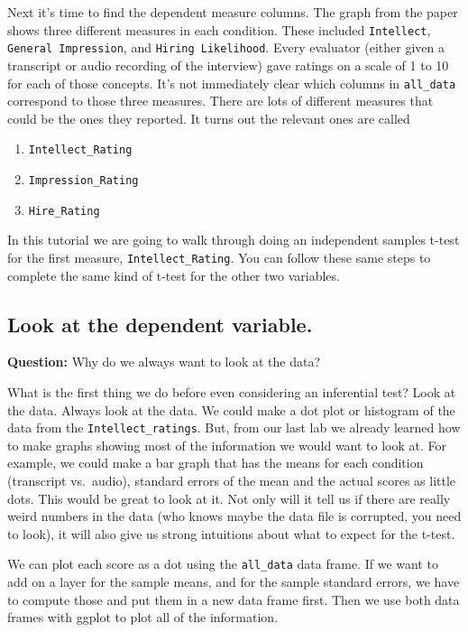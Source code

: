 \documentclass[]{book}
\providecommand{\tightlist}{%
  \setlength{\itemsep}{0pt}\setlength{\parskip}{0pt}}
\begin{document}
Next it's time to find the dependent measure columns. The graph from the
paper shows three different measures in each condition. These included
\texttt{Intellect}, \texttt{General\ Impression}, and
\texttt{Hiring\ Likelihood}. Every evaluator (either given a transcript
or audio recording of the interview) gave ratings on a scale of 1 to 10
for each of those concepts. It's not immediately clear which columns in
\texttt{all\_data} correspond to those three measures. There are lots of
different measures that could be the ones they reported. It turns out
the relevant ones are called

\begin{enumerate}
\def\labelenumi{\arabic{enumi}.}
\tightlist
\item
  \texttt{Intellect\_Rating}
\item
  \texttt{Impression\_Rating}
\item
  \texttt{Hire\_Rating}
\end{enumerate}

In this tutorial we are going to walk through doing an independent
samples t-test for the first measure, \texttt{Intellect\_Rating}. You
can follow these same steps to complete the same kind of t-test for the
other two variables.

\subsection{Look at the dependent
variable.}\label{look-at-the-dependent-variable.}

\textbf{Question:} Why do we always want to look at the data?

What is the first thing we do before even considering an inferential
test? Look at the data. Always look at the data. We could make a dot
plot or histogram of the data from the \texttt{Intellect\_ratings}. But,
from our last lab we already learned how to make graphs showing most of
the information we would want to look at. For example, we could make a
bar graph that has the means for each condition (transcript vs.~audio),
standard errors of the mean and the actual scores as little dots. This
would be great to look at it. Not only will it tell us if there are
really weird numbers in the data (who knows maybe the data file is
corrupted, you need to look), it will also give us strong intuitions
about what to expect for the t-test.

We can plot each score as a dot using the \texttt{all\_data} data frame.
If we want to add on a layer for the sample means, and for the sample
standard errors, we have to compute those and put them in a new data
frame first. Then we use both data frames with ggplot to plot all of the
information.
\end{document}
